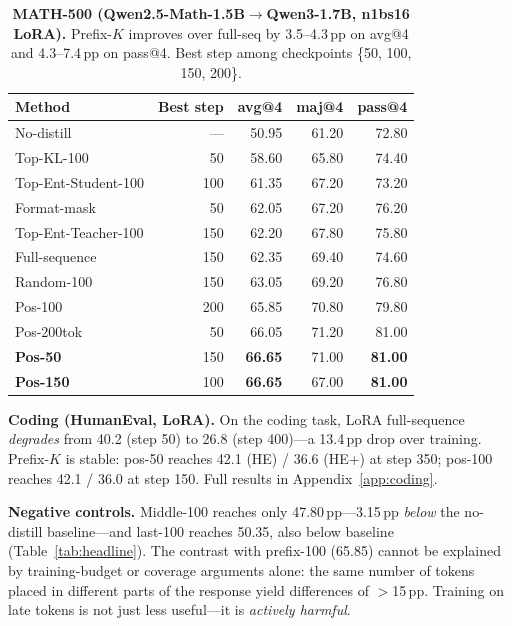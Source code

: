 \documentclass[10pt]{article}
\begin{document}
\begin{table}[t]
\centering
\caption{\textbf{MATH-500 (Qwen2.5-Math-1.5B$\to$Qwen3-1.7B, n1bs16 LoRA).} Prefix-$K$ improves over full-seq by 3.5--4.3\,pp on avg@4 and 4.3--7.4\,pp on pass@4. Best step among checkpoints \{50, 100, 150, 200\}.}
\label{tab:math_main}
\small
\begin{tabular}{@{}lrrrr@{}}
\toprule
\textbf{Method} & \textbf{Best step} & \textbf{avg@4} & \textbf{maj@4} & \textbf{pass@4} \\
\midrule
No-distill         & ---  & 50.95 & 61.20 & 72.80 \\
Top-KL-100         & 50   & 58.60 & 65.80 & 74.40 \\
Top-Ent-Student-100& 100  & 61.35 & 67.20 & 73.20 \\
Format-mask        & 50   & 62.05 & 67.20 & 76.20 \\
Top-Ent-Teacher-100& 150  & 62.20 & 67.80 & 75.80 \\
Full-sequence      & 150  & 62.35 & 69.40 & 74.60 \\
Random-100         & 150  & 63.05 & 69.20 & 76.80 \\
Pos-100            & 200  & 65.85 & 70.80 & 79.80 \\
Pos-200tok         & 50   & 66.05 & 71.20 & 81.00 \\
\textbf{Pos-50}    & 150  & \textbf{66.65} & 71.00 & \textbf{81.00} \\
\textbf{Pos-150}   & 100  & \textbf{66.65} & 67.00 & \textbf{81.00} \\
\bottomrule
\end{tabular}
\end{table}

\textbf{Coding (HumanEval, LoRA).} On the coding task, LoRA full-sequence \emph{degrades} from 40.2 (step 50) to 26.8 (step 400)---a 13.4\,pp drop over training. Prefix-$K$ is stable: pos-50 reaches 42.1 (HE) / 36.6 (HE+) at step 350; pos-100 reaches 42.1 / 36.0 at step 150. Full results in Appendix~\ref{app:coding}.

\textbf{Negative controls.} Middle-100 reaches only 47.80\,pp---3.15\,pp \emph{below} the no-distill baseline---and last-100 reaches 50.35, also below baseline (Table~\ref{tab:headline}). The contrast with prefix-100 (65.85) cannot be explained by training-budget or coverage arguments alone: the same number of tokens placed in different parts of the response yield differences of $>$15\,pp. Training on late tokens is not just less useful---it is \emph{actively harmful}.
\end{document}
